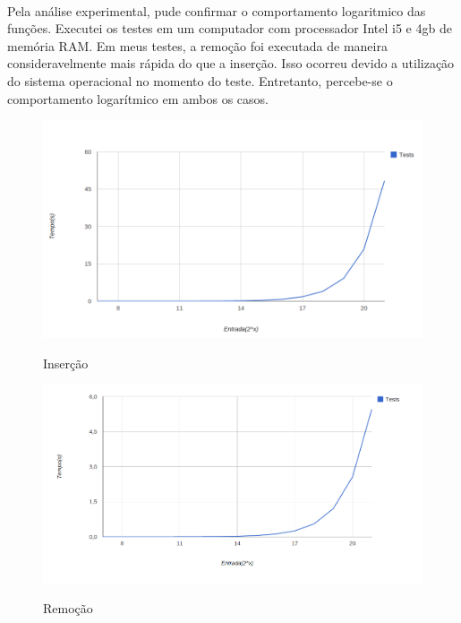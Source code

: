 \documentclass[a4paper, 12pt]{article}
\begin{document}
\paragraph{}
Pela análise experimental, pude confirmar o comportamento logaritmico das funções. Executei os testes em um computador com processador Intel i5 e 4gb de memória RAM. Em meus testes, a remoção foi executada de maneira consideravelmente mais rápida do que a inserção. Isso ocorreu devido a utilização do sistema operacional no momento do teste. Entretanto, percebe-se o comportamento logarítmico em ambos os casos.
\begin{figure}
\caption{Inserção}
 \centering %
\includegraphics[width=15cm]{char_insert.png} %
\label{figura:ins}
\end{figure}
\begin{figure}
\caption{Remoção}
 \centering %
\includegraphics[width=15cm]{char_remv.png} %
\label{figura:rem}
\end{figure}
\end{document}
